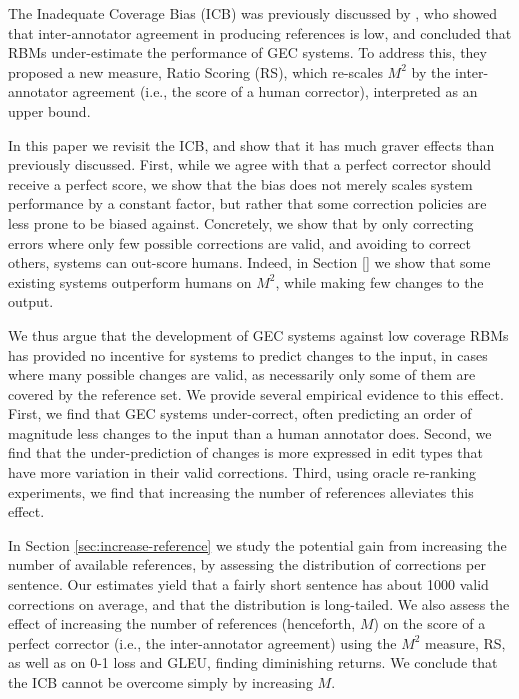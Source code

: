 \documentclass[a4paper, 11pt]{article}
\newcommand{\lc}[1]{\footnote{\color{blue}LC: #1}}
\begin{document}
  The Inadequate Coverage Bias (ICB) was previously discussed by \citet{bryant2015far}, who showed that inter-annotator agreement in producing references is low, 
  and concluded that RBMs under-estimate the performance of GEC systems.
  To address this, they proposed a new measure, Ratio Scoring (RS), which re-scales $M^2$ 
  by the inter-annotator agreement (i.e., the score of a human corrector), interpreted as an upper bound.

  In this paper we revisit the ICB, and show that it has much graver effects than previously discussed. First, while we agree with \citet{bryant2015far} that a
  perfect corrector should receive a perfect score, we show that the bias does not merely scales system performance by a constant factor, but
  rather that some correction policies are less prone to be biased against. 
  Concretely, we show that by only correcting errors where only few possible corrections are valid, and avoiding to correct others, 
  systems can out-score humans. 
  Indeed, in Section \ref{} we show that some existing systems outperform humans on $M^2$, while making few changes to the output.
  
  We thus argue that the development of GEC systems against low coverage RBMs has provided no incentive for systems to predict changes to the input, in cases where many possible changes are valid, as necessarily only some of them are covered by the reference set. We provide several empirical evidence to this effect. First, we find that GEC systems under-correct, often predicting an order of magnitude less changes to the input than a human annotator does.
  Second, we find that the under-prediction of changes is more expressed in edit types that have more variation in their valid corrections.
  Third, using oracle re-ranking experiments, we find that increasing the number of references alleviates this effect.
    
  In Section \ref{sec:increase-reference} we study the potential gain from increasing the number of available references,
  by assessing the distribution of corrections per sentence.
  Our estimates yield that a fairly short sentence has about 1000 valid corrections on average, and that the distribution is long-tailed. 
  We also assess the effect of increasing the number of references (henceforth, $M$) on the score of a perfect corrector (i.e., the inter-annotator agreement) 
  using the $M^2$ measure, RS, as well as on 0-1 loss and GLEU, finding diminishing returns. We conclude that the ICB cannot be overcome simply by
  increasing $M$.
\end{document}
